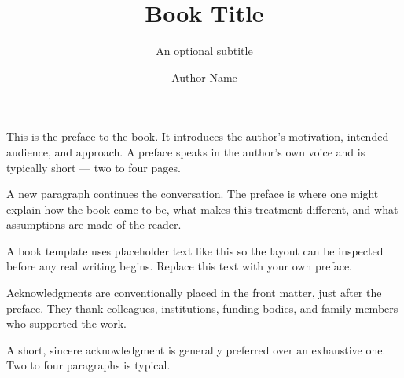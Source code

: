 \documentclass[11pt,twoside,b5paper]{book}
\begin{document}
\frontmatter
{}
\pagestyle{frontmatterstyle}


\title{Book Title}
\subtitle{An optional subtitle}
\author{Author Name}
\date{\the\year}


\booktitlepage





\booktoc
\cleardoublepage


This is the preface to the book. It introduces the author's motivation, intended audience, and approach. A preface speaks in the author's own voice and is typically short --- two to four pages.

A new paragraph continues the conversation. The preface is where one might explain how the book came to be, what makes this treatment different, and what assumptions are made of the reader.

A book template uses placeholder text like this so the layout can be inspected before any real writing begins. Replace this text with your own preface.

\cleardoublepage


Acknowledgments are conventionally placed in the front matter, just after the preface. They thank colleagues, institutions, funding bodies, and family members who supported the work.

A short, sincere acknowledgment is generally preferred over an exhaustive one. Two to four paragraphs is typical.

\cleardoublepage


\mainmatter
\pagestyle{chapterstyle}
\end{document}
